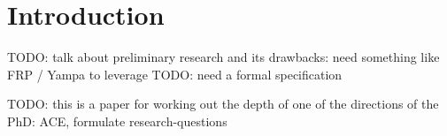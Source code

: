 \section{Introduction}


TODO: talk about preliminary research and its drawbacks: need something like FRP / Yampa to leverage
TODO: need a formal specification

TODO: this is a paper for working out the depth of one of the directions of the PhD: ACE, formulate research-questions

